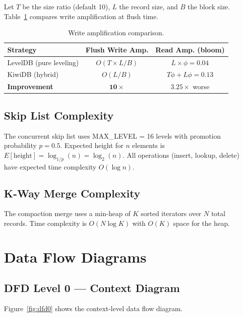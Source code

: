 \documentclass[oneside,a4paper,12pt]{book}
\begin{document}
Let $T$ be the size ratio (default 10), $L$ the record size, and $B$ the block size. Table~\ref{tab:write-amp} compares write amplification at flush time.

\begin{table}[H]
\centering
\label{tab:write-amp}
\renewcommand{\arraystretch}{1.3}
\begin{tabular}{|l|c|c|}
\hline
\textbf{Strategy} & \textbf{Flush Write Amp.} & \textbf{Read Amp. (bloom)} \\
\hline
LevelDB (pure leveling) & $O(T \times L/B)$ & $L \times \phi = 0.04$ \\
\hline
KiwiDB (hybrid) & $O(L/B)$ & $T\phi + L\phi = 0.13$ \\
\hline
\textbf{Improvement} & $\mathbf{10\times}$ & $3.25\times$ worse \\
\hline
\end{tabular}
\caption{Write amplification comparison.}
\end{table}

\subsection{Skip List Complexity}

The concurrent skip list uses MAX\_LEVEL = 16 levels with promotion probability $p = 0.5$. Expected height for $n$ elements is $E[\text{height}] = \log_{1/p}(n) = \log_2(n)$. All operations (insert, lookup, delete) have expected time complexity $O(\log n)$.

\subsection{K-Way Merge Complexity}

The compaction merge uses a min-heap of $K$ sorted iterators over $N$ total records. Time complexity is $O(N \log K)$ with $O(K)$ space for the heap.

\section{Data Flow Diagrams}

\subsection{DFD Level 0 --- Context Diagram}

Figure~\ref{fig:dfd0} shows the context-level data flow diagram.
\end{document}
